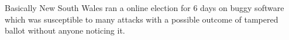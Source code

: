   \noindent
  Basically New South Wales ran a online election for 6 days on 
  buggy software which was susceptible to many attacks with a possible 
  outcome of tampered ballot without anyone noticing it. 
%  
%   
%   
   
